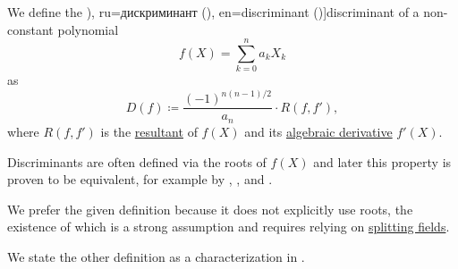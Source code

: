 \begin{definition}\label{def:discriminant}
  We define the \term[bg=дискриминанта (\cite[215]{Обрешков1962ВисшаАлгебра}), ru=дискриминант (\cite[141]{Винберг2014Алгебра}), en=discriminant (\cite[223]{Rotman2015AlgebraPart1})]{discriminant} of a non-constant polynomial
  \begin{equation*}
    f(X) = \sum_{k=0}^n a_k X_k
  \end{equation*}
  as
  \begin{equation*}
    D(f) \coloneqq \frac {(-1)^{n(n-1)/2}} {a_n} \cdot R(f, f'),
  \end{equation*}
  where \( R(f, f') \) is the \hyperref[def:resultant]{resultant} of \( f(X) \) and its \hyperref[def:algebraic_derivative]{algebraic derivative} \( f'(X) \).
\end{definition}
\begin{comments}
  \item Discriminants are often defined via the roots of \( f(X) \) and later this property is proven to be equivalent, for example by
  ,
  ,
   and
  .

  We prefer the given definition because it does not explicitly use roots, the existence of which is a strong assumption and requires relying on \hyperref[def:splitting_field]{splitting fields}.

  We state the other definition as a characterization in .
\end{comments}

